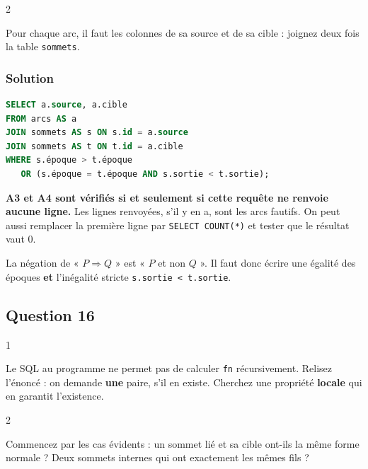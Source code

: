 \documentclass[11pt,a4paper]{article}
\begin{document}
\begin{indication}{2}

Pour chaque arc, il faut les colonnes de sa source et de sa cible : joignez deux fois la table \texttt{sommets}.

\end{indication}

\hypertarget{solution-14}{%
\subsubsection{Solution}\label{solution-14}}

\begin{lstlisting}[language=SQL]
SELECT a.source, a.cible
FROM arcs AS a
JOIN sommets AS s ON s.id = a.source
JOIN sommets AS t ON t.id = a.cible
WHERE s.époque > t.époque
   OR (s.époque = t.époque AND s.sortie < t.sortie);
\end{lstlisting}

\textbf{A3 et A4 sont vérifiés si et seulement si cette requête ne renvoie aucune ligne.} Les lignes renvoyées, s'il y en a, sont les arcs fautifs. On peut aussi remplacer la première ligne par \texttt{SELECT\ COUNT(*)} et tester que le résultat vaut 0.

\begin{piege}

La négation de « \(P\Rightarrow Q\) » est « \(P\) et non \(Q\) ». Il faut donc écrire une égalité des époques \textbf{et} l'inégalité stricte \texttt{s.sortie\ \textless{}\ t.sortie}.

\end{piege}

\hypertarget{question-16}{%
\subsection{Question 16}\label{question-16}}

\begin{indication}{1}

Le SQL au programme ne permet pas de calculer \texttt{fn} récursivement. Relisez l'énoncé : on demande \textbf{une} paire, s'il en existe. Cherchez une propriété \textbf{locale} qui en garantit l'existence.

\end{indication}

\begin{indication}{2}

Commencez par les cas évidents : un sommet lié et sa cible ont-ils la même forme normale ? Deux sommets internes qui ont exactement les mêmes fils ?

\end{indication}
\end{document}
